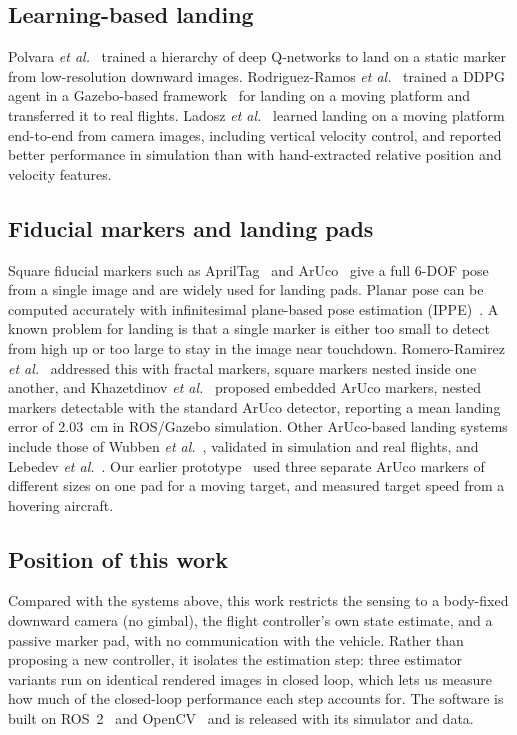 \documentclass[conference]{IEEEtran}
\begin{document}
\subsection{Learning-based landing}
Polvara \emph{et al.}~\cite{polvara2018toward} trained a hierarchy of deep Q-networks to land on
a static marker from low-resolution downward images. Rodriguez-Ramos
\emph{et al.}~\cite{rodriguezramos2019deep} trained a DDPG agent in a Gazebo-based
framework~\cite{koenig2004design} for landing on a moving platform and transferred it to real
flights. Ladosz \emph{et al.}~\cite{ladosz2024autonomous} learned landing on a moving platform
end-to-end from camera images, including vertical velocity control, and reported better
performance in simulation than with hand-extracted relative position and velocity features.

\subsection{Fiducial markers and landing pads}
Square fiducial markers such as AprilTag~\cite{olson2011apriltag,wang2016apriltag} and
ArUco~\cite{garrido2014aruco,romero2018speeded} give a full 6-DOF pose from a single image and
are widely used for landing pads. Planar pose can be computed accurately with infinitesimal
plane-based pose estimation (IPPE)~\cite{collins2014infinitesimal}. A known problem for landing
is that a single marker is either too small to detect from high up or too large to stay in the
image near touchdown. Romero-Ramirez \emph{et al.}~\cite{romeroramirez2019fractal} addressed
this with fractal markers, square markers nested inside one another, and Khazetdinov
\emph{et al.}~\cite{khazetdinov2021embedded} proposed embedded ArUco markers, nested markers
detectable with the standard ArUco detector, reporting a mean landing error of \SI{2.03}{cm}
in ROS/Gazebo simulation. Other ArUco-based landing systems include those of Wubben
\emph{et al.}~\cite{wubben2019accurate}, validated in simulation and real flights, and Lebedev
\emph{et al.}~\cite{lebedev2020accurate}. Our earlier
prototype~\cite{wickramanayake2019landing} used three separate ArUco markers of different
sizes on one pad for a moving target, and measured target speed from a hovering aircraft.

\subsection{Position of this work}
Compared with the systems above, this work restricts the sensing to a body-fixed downward
camera (no gimbal), the flight controller's own state estimate, and a passive marker pad,
with no communication with the vehicle. Rather than proposing a new controller, it isolates
the estimation step: three estimator variants run on identical rendered images in closed loop,
which lets us measure how much of the closed-loop performance each step accounts for. The
software is built on ROS~2~\cite{macenski2022robot} and OpenCV~\cite{bradski2000opencv} and is
released with its simulator and data.
\end{document}
